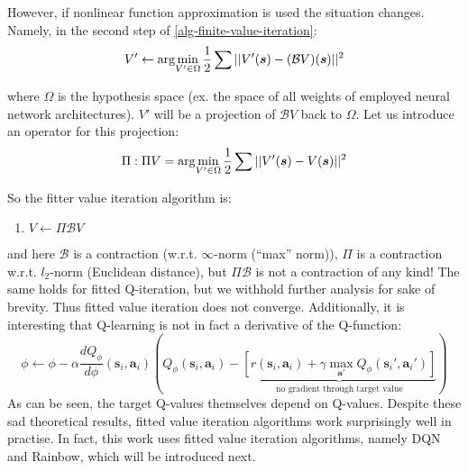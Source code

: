 However, if nonlinear function approximation is used the situation changes.
Namely, in the second step of \ref{alg-finite-value-iteration}:
\begin{equation}
		V' \leftarrow \arg\!\min_{V' \in \Omega} \frac{1}{2} \sum_{}^{} ||V'(\bm{s}) - (\mathcal{B}V)(\bm{s})||^2
\end{equation}
where $\Omega$ is the hypothesis space (ex. the space of all weights of employed neural network architectures).
$V'$ will be a projection of $\mathcal{B}V$ back to $\Omega$.
Let us introduce an operator for this projection:
\begin{equation}
		\Pi : \Pi V = \arg\!\min_{V' \in \Omega} \frac{1}{2} \sum_{}^{} ||V'(\bm{s}) - V(\bm{s})||^2
\end{equation}
So the fitter value iteration algorithm is:
\begin{enumerate}
		\item $V \leftarrow \Pi \mathcal{B} V$
\end{enumerate}
and here $\mathcal{B}$ is a contraction (w.r.t. $\infty$-norm (``max'' norm)),
$\Pi$ is a contraction w.r.t. $l_2$-norm (Euclidean distance), but
$\Pi \mathcal{B}$ is not a contraction of any kind!
The same holds for fitted Q-iteration, but we withhold further analysis for 
sake of brevity.
Thus fitted value iteration does not converge.
Additionally, it is interesting that Q-learning is not in fact a 
derivative of the Q-function:
\begin{equation}
	 \phi \leftarrow \phi - \alpha \frac{d Q_\phi}{d\phi} (\bm{s}_{i}, \bm{a}_{i}) \left( Q_\phi(\bm{s}_{i}, \bm{a}_{i}) - 
	 \underbrace{\left[ r(\bm{s}_{i}, \bm{a}_{i}) + \gamma \max_{\bm{a}'} Q_\phi (\bm{s}_{i}', \bm{a}_{i}') \right] }_{\text{no gradient through target value}}
\right)  	
\end{equation}
As can be seen, the target Q-values themselves depend on Q-values.
Despite these sad theoretical results,
fitted value iteration algorithms work surprisingly well in practise.
In fact, this work uses fitted value iteration algorithms,
namely DQN and Rainbow, which will be introduced next.


